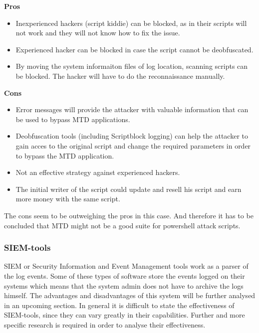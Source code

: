 \documentclass{article}%
\begin{document}
\textbf{Pros}
\begin{itemize}
	\item Inexperienced hackers (script kiddie) can be blocked, as in their scripts will not work and they will not know how to fix the issue.
	\item Experienced hacker can be blocked in case the script cannot be deobfuscated.
	\item By moving the system informaiton files of log location, scanning scripts can be blocked. The hacker will have to do the reconnaissance manually.
\end{itemize}
\textbf{Cons}
\begin{itemize}
	\item Error messages will provide the attacker with valuable information that can be used to bypass MTD applications.
	\item Deobfuscation tools (including Scriptblock logging) can help the attacker to gain acces to the original script and change the required parameters in order to bypass the MTD application.
	\item Not an effective strategy against experienced hackers.
	\item The initial writer of the script could update and resell his script and earn more money with the same script.
\end{itemize}
The cons seem to be outweighing the pros in this case. And therefore it has to be concluded that MTD might not be a good suite for powershell attack scripts.

\subsubsection{SIEM-tools}
SIEM or Security Information and Event Management tools work as a parser of the log events. Some of these types of software store the events logged on their systems which means that the system admin does not have to archive the logs himself. The advantages and disadvantages of this system will be further analysed in an upcoming section. In general it is difficult to state the effectiveness of SIEM-tools, since they can vary greatly in their capabilities. Further and more specific research is required in order to analyse their effectiveness.
\end{document}
